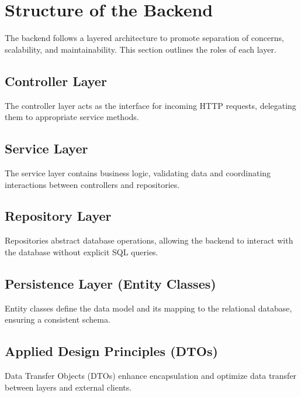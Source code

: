 \Author{\daAuthorThree}

\usepackage{amsmath}



    \section{Structure of the Backend}
    The backend follows a layered architecture to promote separation of concerns, scalability, and maintainability. This section outlines the roles of each layer.

    \subsection{Controller Layer}
    The controller layer acts as the interface for incoming HTTP requests, delegating them to appropriate service methods.

    \subsection{Service Layer}
    The service layer contains business logic, validating data and coordinating interactions between controllers and repositories.

    \subsection{Repository Layer}
    Repositories abstract database operations, allowing the backend to interact with the database without explicit SQL queries.

    \subsection{Persistence Layer (Entity Classes)}
    Entity classes define the data model and its mapping to the relational database, ensuring a consistent schema.

    \subsection{Applied Design Principles (DTOs)}
    Data Transfer Objects (DTOs) enhance encapsulation and optimize data transfer between layers and external clients.

